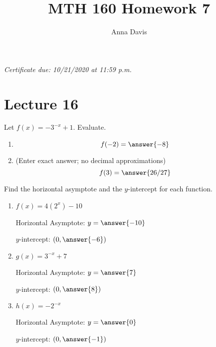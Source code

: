 \documentclass{ximera}
\author{Anna Davis} \title{MTH 160 Homework 7}
\begin{document}
\begin{abstract}

\end{abstract}
\maketitle
 \textit{Certificate due: 10/21/2020 at 11:59 p.m.}
 \section{Lecture 16}
 
  \begin{problem}\label{prob:160hom7prob1} 
Let $f(x)=-3^{-x}+1$.  Evaluate.
  \begin{enumerate}
\item
 $$f(-2)=\answer{-8}$$
\item (Enter exact answer; no decimal approximations)
$$f(3)=\answer{26/27}$$
  \end{enumerate}
\end{problem}  
   \begin{problem}\label{prob:160hom7prob2}
 Find the horizontal asymptote and the $y$-intercept for each function.
 \begin{enumerate}
     \item $f(x)=4(2^x)-10$
     
     Horizontal Asymptote: $y=\answer{-10}$
     
     $y$-intercept: $(0, \answer{-6})$
      \item $g(x)=3^{-x}+7$
     
     Horizontal Asymptote: $y=\answer{7}$
     
     $y$-intercept: $(0, \answer{8})$
     \item $h(x)=-2^{-x}$
     
     Horizontal Asymptote: $y=\answer{0}$
     
     $y$-intercept: $(0, \answer{-1})$
 \end{enumerate}
   \end{problem}
\end{document}
